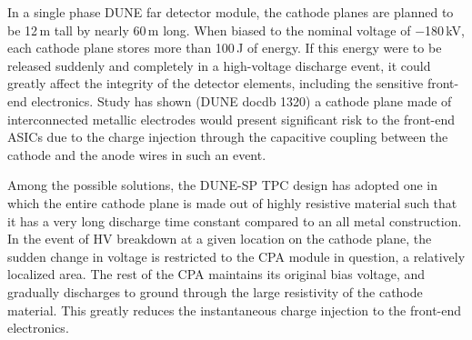 In a single phase DUNE far detector module, the cathode planes are planned to be 12\,m tall by nearly 60\,m long.  When biased to the nominal voltage of $-$180\,kV, each cathode plane stores more than 100\,J of energy. If this energy were to be released  suddenly and completely in a high-voltage discharge event, it could greatly affect the integrity of the detector elements, including the sensitive front-end electronics.  
Study has shown (DUNE docdb 1320)  a cathode plane made of interconnected metallic electrodes would present significant risk to the front-end ASICs due to the charge injection through the capacitive coupling between the cathode and the anode wires in such an event.  




Among the possible solutions, the DUNE-SP TPC design has adopted one in which the entire cathode plane is made out of highly resistive material such that it has a very long discharge time constant compared to an all metal construction.  In the event of HV breakdown at a given location on the cathode plane, the sudden change in voltage is restricted to the CPA module in question,  a relatively localized area.  The rest of the CPA maintains its original bias voltage, and gradually discharges to ground through the large resistivity of the cathode material.  This greatly reduces the instantaneous charge injection to the front-end electronics.


